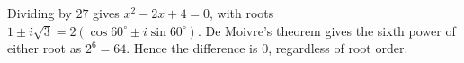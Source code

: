 Dividing by $27$ gives $x^2-2x+4=0$, with roots $1\pm i\sqrt3=2(\cos60^\circ\pm i\sin60^\circ)$. De Moivre's theorem gives the sixth power of either root as $2^6=64$. Hence the difference is $\boxed0$, regardless of root order.
